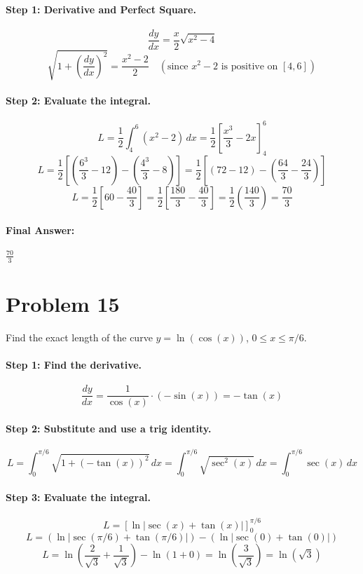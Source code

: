 \documentclass{article}
\begin{document}
\paragraph{Step 1: Derivative and Perfect Square.}
\[ \frac{dy}{dx} = \frac{x}{2}\sqrt{x^2 - 4} \]
\[ \sqrt{1 + (\frac{dy}{dx})^2} = \frac{x^2 - 2}{2} \quad (\text{since } x^2-2 \text{ is positive on } [4, 6]) \]

\paragraph{Step 2: Evaluate the integral.}
\[ L = \frac{1}{2} \int_{4}^{6} (x^2 - 2) \,dx = \frac{1}{2} [\frac{x^3}{3} - 2x]_{4}^{6} \]
\[ L = \frac{1}{2} [ (\frac{6^3}{3} - 12) - (\frac{4^3}{3} - 8) ] = \frac{1}{2} [ (72 - 12) - (\frac{64}{3} - \frac{24}{3}) ] \]
\[ L = \frac{1}{2} [ 60 - \frac{40}{3} ] = \frac{1}{2} [ \frac{180}{3} - \frac{40}{3} ] = \frac{1}{2}(\frac{140}{3}) = \frac{70}{3} \]

\paragraph{Final Answer:} $\frac{70}{3}$

\section*{Problem 15}
Find the exact length of the curve $y = \ln(\cos(x))$, $0 \le x \le \pi/6$.

\paragraph{Step 1: Find the derivative.}
\[ \frac{dy}{dx} = \frac{1}{\cos(x)} \cdot (-\sin(x)) = -\tan(x) \]

\paragraph{Step 2: Substitute and use a trig identity.}
\[ L = \int_{0}^{\pi/6} \sqrt{1 + (-\tan(x))^2} \,dx = \int_{0}^{\pi/6} \sqrt{\sec^2(x)} \,dx = \int_{0}^{\pi/6} \sec(x) \,dx \]

\paragraph{Step 3: Evaluate the integral.}
\[ L = [\ln|\sec(x) + \tan(x)|]_{0}^{\pi/6} \]
\[ L = (\ln|\sec(\pi/6) + \tan(\pi/6)|) - (\ln|\sec(0) + \tan(0)|) \]
\[ L = \ln(\frac{2}{\sqrt{3}} + \frac{1}{\sqrt{3}}) - \ln(1 + 0) = \ln(\frac{3}{\sqrt{3}}) = \ln(\sqrt{3}) \]
\end{document}

